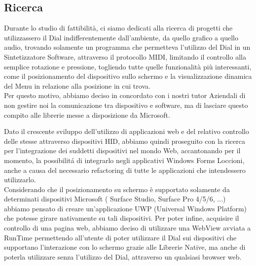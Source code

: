 \subsection{Ricerca}

Durante lo studio di fattibilità, ci siamo dedicati alla ricerca di progetti che utilizzassero il Dial \cite{son} indifferentemente dall’ambiente, da quello grafico a quello audio, trovando solamente un programma che permetteva l'utilizzo del Dial in un Sintetizzatore Software, attraverso il protocollo MIDI, limitando il controllo alla semplice rotazione e pressione, togliendo tutte quelle funzionalità più interessanti, come il posizionamento del dispositivo sullo schermo e la visualizzazione dinamica del Menu in relazione alla posizione in cui trova.\\

Per questo motivo, abbiamo deciso in concordato con i nostri tutor Aziendali di non gestire noi la comunicazione tra dispositivo e software, ma di lasciare questo compito alle librerie messe a disposizione da Microsoft.

Dato il crescente sviluppo dell'utilizzo di applicazioni web e del relativo controllo delle stesse attraverso dispositivi HID, abbiamo quindi proseguito con la ricerca per l'integrazione dei suddetti dispositivi nel mondo Web, accantonando per il momento, la possibilitá di integrarlo negli applicativi Windows Forms Loccioni, anche a causa del necessario refactoring di tutte le applicazioni che intendessero utilizzarlo.\\

Considerando che il posizionamento su schermo è supportato solamente da determinati dispositivi Microsoft ( Surface Studio, Surface Pro 4/5/6, ...) abbiamo pensato di creare un’applicazione UWP (Universal Windows Platform) che potesse girare nativamente su tali dispositivi. Per poter infine, acquisire il controllo di una pagina web, abbiamo deciso di utilizzare una WebView avviata a RunTime permettendo all'utente di poter utilizzare il Dial sui dispositivi che supportano l'interazione con lo schermo grazie alle Librerie Native, ma anche di poterla utilizzare senza l'utilizzo del Dial, attraverso un qualsiasi browser web.

\newpage
